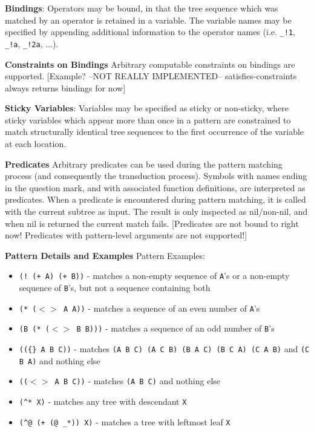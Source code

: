 \documentclass[11pt]{article}
\begin{document}
{\bf Bindings}:
Operators may be bound, in that the tree sequence which was matched by an operator is retained in a variable.   The variable names may be specified by appending additional information to the operator names (i.e.  \texttt{\_!1}, \texttt{\_!a}, \texttt{\_!2a}, ...).    

{\bf Constraints on Bindings}
Arbitrary computable constraints on bindings are supported.  [Example? --NOT REALLY IMPLEMENTED-- satisfies-constraints always returns bindings for now]

{\bf Sticky Variables}:
Variables may be specified as sticky or non-sticky, where sticky variables which appear more than once in a pattern are constrained to match structurally identical tree sequences to the first occurrence of the variable at each location.

{\bf Predicates}
Arbitrary predicates can be used during the pattern matching process (and consequently the transduction process).   Symbols with names ending in the question mark, and with associated function definitions, are interpreted as predicates.  When a predicate is encountered during pattern matching, it is called with the current subtree as input.  The result is only inspected as nil/non-nil, and when nil is returned the current match fails. [Predicates are not bound to right now!  Predicates with pattern-level arguments are not supported!]


{\bf Pattern Details and Examples}
  Pattern Examples:
  \begin{itemize}
  \item \texttt{(! (+ A) (+ B))} -   matches a non-empty sequence of \texttt{A}'s or a non-empty sequence of \texttt{B}'s, but not a sequence containing both
  \item \texttt{(* ($<>$ A A))}  -   matches a sequence of an even number of \texttt{A}'s
  \item \texttt{(B (* ($<>$ B B)))}  -  matches a sequence of an odd number of \texttt{B}'s
  \item \texttt{((\{\} A B C))}  -   matches \texttt{(A B C) (A C B) (B A C) (B C A) (C A B)} and \texttt{(C B A)} and nothing else
  \item \texttt{(($<>$ A B C))}   -  matches \texttt{(A B C)} and nothing else
  \item \texttt{(\^{}* X)}  -   matches any tree with descendant \texttt{X}
  \item \texttt{(\^{}@ (+  (@ \_*)) X)}  -  matches a tree with leftmost leaf \texttt{X}
  \end{itemize}
\end{document}
